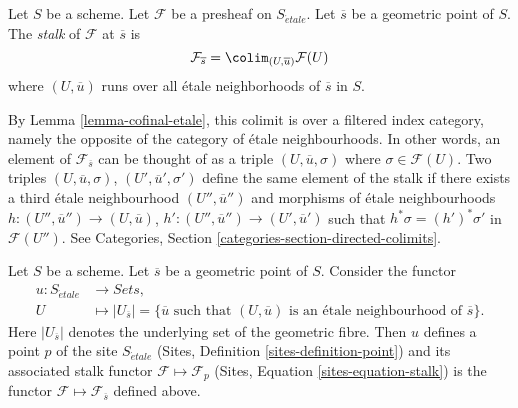 \begin{definition}
\label{definition-stalk}
Let $S$ be a scheme.
Let $\mathcal{F}$ be a presheaf on $S_{\acute{e}tale}$.
Let $\overline{s}$ be a geometric point of $S$.
The {\it stalk} of $\mathcal{F}$ at $\overline{s}$ is
$$
\mathcal{F}_{\overline{s}}
=
\colim_{(U, \overline{u})} \mathcal{F}(U)
$$
where $(U, \overline{u})$ runs over all \'etale
neighborhoods of $\overline{s}$ in $S$.
\end{definition}

\noindent
By Lemma \ref{lemma-cofinal-etale}, this colimit is over a filtered
index category, namely the opposite of the category of \'etale neighbourhoods.
In other words, an element of $\mathcal{F}_{\overline{s}}$ can be
thought of as a triple $(U, \overline{u}, \sigma)$ where
$\sigma \in \mathcal{F}(U)$. Two triples
$(U, \overline{u}, \sigma)$, $(U', \overline{u}', \sigma')$
define the same element of the stalk if there exists a third
\'etale neighbourhood $(U'', \overline{u}'')$ and morphisms of \'etale
neighbourhoods $h : (U'', \overline{u}'') \to (U, \overline{u})$,
$h' : (U'', \overline{u}'') \to (U', \overline{u}')$ such that
$h^*\sigma = (h')^*\sigma'$ in $\mathcal{F}(U'')$. See
Categories, Section \ref{categories-section-directed-colimits}.

\begin{lemma}
\label{lemma-stalk-gives-point}
Let $S$ be a scheme. Let $\overline{s}$ be a geometric point of $S$.
Consider the functor
\begin{align*}
u : S_{\acute{e}tale} & \longrightarrow \textit{Sets}, \\
U & \longmapsto
|U_{\overline{s}}|
=
\{\overline{u} \text{ such that }(U, \overline{u})
\text{ is an \'etale neighbourhood of }\overline{s}\}.
\end{align*}
Here $|U_{\overline{s}}|$ denotes the underlying set of the geometric fibre.
Then $u$ defines a point $p$ of the site $S_{\acute{e}tale}$
(Sites, Definition \ref{sites-definition-point})
and its associated stalk functor $\mathcal{F} \mapsto \mathcal{F}_p$
(Sites, Equation \ref{sites-equation-stalk})
is the functor $\mathcal{F} \mapsto \mathcal{F}_{\overline{s}}$
defined above.
\end{lemma}

